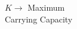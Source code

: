 \documentclass[preview]{standalone}
\begin{document}
\begin{center}
$K \rightarrow$ Maximum\\Carrying Capacity
\end{center}
\end{document}
